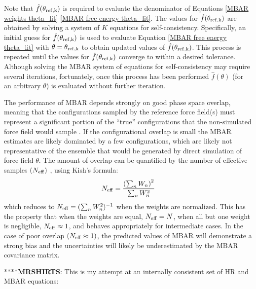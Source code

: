 \documentclass[journal=jced,manuscript=article]{achemso}
\begin{document}
Note that $\hat f(\theta_{\rm ref,k})$ is required to evaluate the denominator of Equations \ref{MBAR weights theta_lit}-\ref{MBAR free energy theta_lit}. The values for $\hat f(\theta_{\rm ref,k})$ are obtained by solving a system of $K$ equations for self-consistency. Specifically, an initial guess for $\hat f(\theta_{\rm ref,k})$ is used to evaluate Equation \ref{MBAR free energy theta_lit} with $\theta=\theta_{\rm ref,k}$ to obtain updated values of $\hat f(\theta_{\rm ref,k})$. This process is repeated until the values for $\hat f(\theta_{\rm ref,k})$ converge to within a desired tolerance. Although solving the MBAR system of equations for self-consistency may require several iterations, fortunately, once this process has been performed $\hat f(\theta)$ (for an arbitrary $\theta$) is evaluated without further iteration.

The performance of MBAR depends strongly on good phase space overlap, meaning that the configurations sampled by the reference force field(s) must represent a significant portion of the ``true'' configurations that the non-simulated force field would sample \cite{naden:jctc:2016}. If the configurational overlap is small the MBAR estimates are likely dominated by a few configurations, which are likely not representative of the ensemble that would be generated by direct simulation of force field $\theta$. The amount of overlap can be quantified by the number of effective samples $(N_{\rm eff})$ \cite{Dybeck2016}, using Kish's formula:
\begin{eqnarray} \label{Neff_lit}
N_{\rm eff} = \frac{\left(\sum_n W_n\right)^2}{\sum_n W_n^2}
\end{eqnarray}
which reduces to $N_{\rm eff} = (\sum_n W_n^2)^{-1}$ when the weights are
normalized. This has the property that when the weights are equal,
$N_{\rm eff} = N$, when all but one weight is negligible, $N_{\rm eff} \approx
1$, and behaves appropriately for intermediate cases. 
In the case of poor overlap $(N_{\rm eff} \approx 1)$, the predicted values of MBAR will demonstrate a strong bias and the uncertainties will likely be underestimated by the MBAR covariance matrix. 


****\textbf{MRSHIRTS}: This is my attempt at an internally consistent set of HR and MBAR equations:

\end{document}
